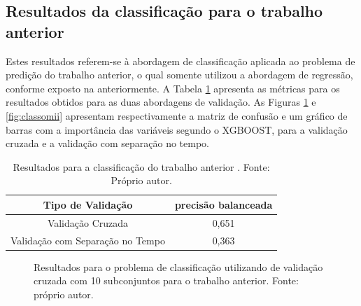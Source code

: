 \subsection{Resultados da classificação para o trabalho anterior}

Estes resultados referem-se à abordagem de classificação aplicada ao problema de predição do trabalho anterior, o qual somente utilizou a abordagem de regressão, conforme exposto na anteriormente. A Tabela \ref{tab:results_class} apresenta as métricas para os resultados obtidos para as duas abordagens de validação. As Figuras \ref{fig:classomik} e \ref{fig:classomii} apresentam respectivamente a matriz de confusão e um gráfico de barras com a importância das variáveis segundo o XGBOOST, para a validação cruzada e a validação com separação no tempo.

\begin{table}[h]
\begin{center}
\begin{tabular}{|c|c|}
\hline
Tipo de Validação & precisão balanceada   \\ \hline
Validação Cruzada                   & 0,651    \\ \hline
Validação com Separação no Tempo    & 0,363     \\ \hline
\end{tabular}
\end{center}
\vspace{12pt}
\caption{Resultados para a classificação do trabalho anterior \cite{REZENDE:2009}. Fonte: Próprio autor.}
\label{tab:results_class}
\end{table}

\begin{figure}[h]
\center
{}
\caption{Resultados para o problema de classificação utilizando de validação cruzada com 10 subconjuntos para o trabalho anterior. Fonte: próprio autor.}
\label{fig:classomik}
\end{figure}

